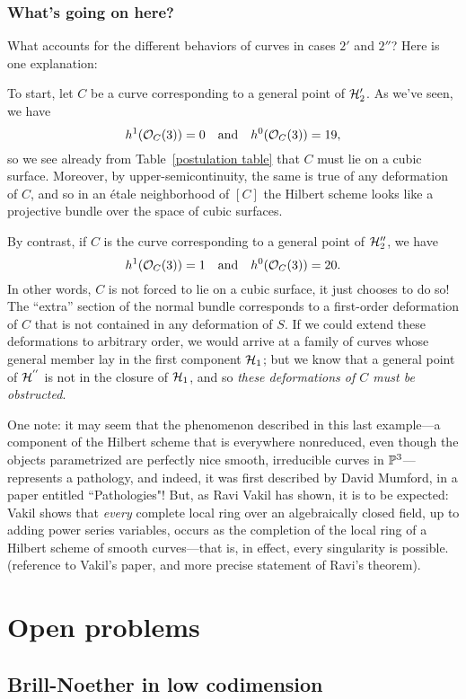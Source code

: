 \subsubsection{What's going on here?}

What accounts for the different behaviors of curves in cases $2'$ and $2''$? Here is one explanation:

To start, let $C$ be a curve corresponding to a general point of $\cH_{2}'$. As we've seen, we have
$$
h^1(\cO_C(3)) = 0 \quad \text{and} \quad h^0(\cO_C(3)) = 19,
$$
so we see already from Table~\ref{postulation table} that $C$ must lie on a cubic surface. Moreover, by upper-semicontinuity, the same is true of any deformation of $C$, and so in an \'etale neighborhood of $[C]$ the Hilbert scheme looks like a projective bundle over the space of cubic surfaces.

By contrast, if $C$ is the curve corresponding to a general point of $\cH_{2}''$, we have
$$
h^1(\cO_C(3)) = 1 \quad \text{and} \quad h^0(\cO_C(3)) = 20.
$$
In other words, $C$ is not forced to lie on a cubic surface, it just chooses to do so! The ``extra'' section of the normal bundle corresponds to a first-order deformation of $C$ that is not contained in any deformation of $S$. 
If we could extend these deformations to arbitrary order, we would arrive at a family of curves whose general member lay in the first component $\cH_1$; but we know that a general point of $ \cH^{''}$ is not in the closure of $\cH_1$, and so \emph{these deformations of $C$ must be obstructed}.

One note: it may seem that the phenomenon described in this last example---a component of the Hilbert scheme that is everywhere nonreduced, even though the objects parametrized are perfectly nice smooth, irreducible curves in $\PP^3$---represents a pathology, and indeed, it was first described by David Mumford, in a paper entitled ``Pathologies"! But, as Ravi Vakil has shown, it is to be expected: Vakil shows that \emph{every} complete local ring over an algebraically closed field, up to adding power series variables, occurs as the completion of the local ring of a Hilbert scheme of smooth curves---that is, in effect, every singularity is possible. (reference to Vakil's paper, and more precise statement of Ravi's theorem).
\section{Open problems}\label{open problems}

\subsection{Brill-Noether in low codimension}

